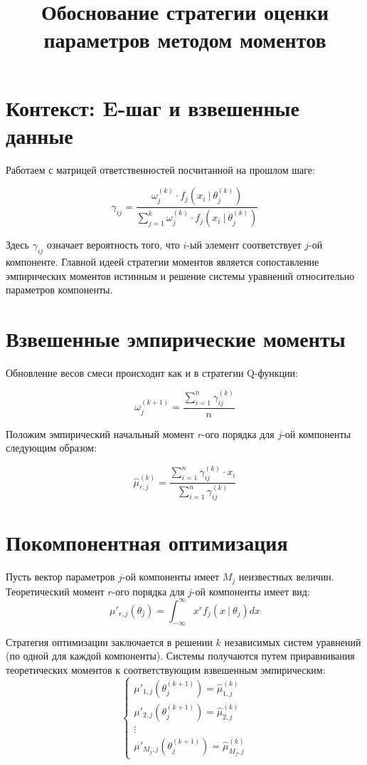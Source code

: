 \documentclass[14pt, a4paper, oneside]{memoir}
\title{Обоснование стратегии оценки параметров методом моментов}
\begin{document}
\begin{titlingpage}
	\maketitle
\end{titlingpage}

\section{Контекст: E-шаг и взвешенные данные}

Работаем с матрицей ответственностей посчитанной на прошлом шаге:

\[\gamma_{ij} = \frac{\omega_j^{(k)} \cdot f_j(x_i ~|~ \theta_j^{(k)})}{\sum_{j=1}^k \omega_j^{(k)} \cdot f_j(x_i ~|~ \theta_j^{(k)})}\]

Здесь $\gamma_{ij}$ означает вероятность того, что $i$-ый элемент соответствует $j$-ой компоненте.
Главной идеей стратегии моментов является сопоставление эмпирических моментов истинным и решение системы уравнений относительно параметров компоненты.

\section{Взвешенные эмпирические моменты}

Обновление весов смеси происходит как и в стратегии Q-функции:

\[\omega_j^{(k+1)} = \frac{\sum_{i=1}^n \gamma^{(k)}_{ij}}{n}\]

Положим эмпирический начальный момент $r$-ого порядка для $j$-ой компоненты следующим образом:

\[\hat{\mu}_{r,j}^{(k)} = \frac{\sum_{i=1}^n \gamma^{(k)}_{ij} \cdot x_i}{\sum_{i=1}^n \gamma^{(k)}_{ij} }\]

\section{Покомпонентная оптимизация}

Пусть вектор параметров $j$-ой компоненты имеет $M_j$ неизвестных величин. Теоретический момент $r$-ого порядка для $j$-ой компоненты имеет вид:
\[\mu'_{r, j}(\theta_j) = \int_{-\infty}^\infty x^r f_j(x ~|~ \theta_j)dx\]

Стратегия оптимизации заключается в решении $k$ независимых систем уравнений (по одной для каждой компоненты). Системы получаются путем приравнивания теоретических моментов к соответствующим взвешенным эмпирическим:
\[\begin{cases} \mu'_{1, j}(\theta_j^{(k+1)}) = \hat{\mu}^{(k)}_{1,j} \\ \mu'_{2, j}(\theta_j^{(k+1)}) = \hat{\mu}^{(k)}_{2,j} \\ \vdots \\ \mu'_{M_j, j}(\theta_j^{(k+1)}) = \hat{\mu}^{(k)}_{M_j,j}\end{cases}\]
\end{document}
